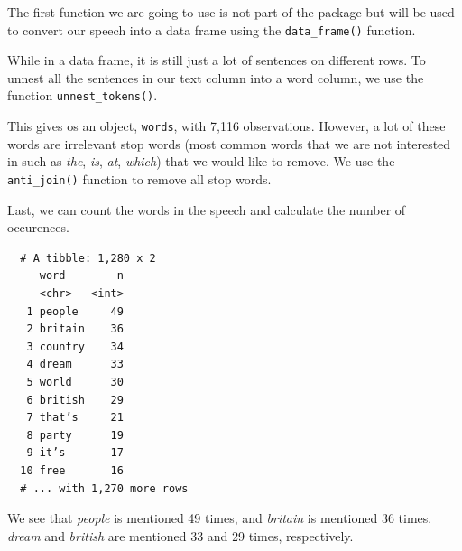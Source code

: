 \documentclass[12pt,oneside]{reedthesis}
\theoremstyle{definition}
\theoremstyle{definition}
\theoremstyle{definition}
\theoremstyle{remark}
\begin{document}
  The first function we are going to use is not part of the package but
  will be used to convert our speech into a data frame using the
  \texttt{data\_frame()} function.
  \begin{Shaded}
  \begin{Highlighting}[]
  \StringTok{ }\NormalTok{(}
  \end{Highlighting}
  \end{Shaded}
  While in a data frame, it is still just a lot of sentences on different
  rows. To unnest all the sentences in our text column into a word column,
  we use the function \texttt{unnest\_tokens()}.
  \begin{Shaded}
  \end{Shaded}
  This gives os an object, \texttt{words}, with 7,116 observations.
  However, a lot of these words are irrelevant stop words (most common
  words that we are not interested in such as \emph{the}, \emph{is},
  \emph{at}, \emph{which}) that we would like to remove. We use the
  \texttt{anti\_join()} function to remove all stop words.
  \begin{Shaded}
  \end{Shaded}
  Last, we can count the words in the speech and calculate the number of
  occurences.
  \begin{Shaded}
  \end{Shaded}
  \begin{verbatim}
  # A tibble: 1,280 x 2
     word        n
     <chr>   <int>
   1 people     49
   2 britain    36
   3 country    34
   4 dream      33
   5 world      30
   6 british    29
   7 that’s     21
   8 party      19
   9 it’s       17
  10 free       16
  # ... with 1,270 more rows
  \end{verbatim}
  We see that \emph{people} is mentioned 49 times, and \emph{britain} is
  mentioned 36 times. \emph{dream} and \emph{british} are mentioned 33 and
  29 times, respectively.
  
\end{document}
